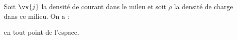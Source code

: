 ﻿\documentclass[a4paper]{article}
\begin{document}
\pagestyle{fancy}
\fancyhf{}
\setlength{\headheight}{15pt}

\begin{center}
	\large{}
\end{center}


Soit \(\vv{j}\) la densité de courant dans le mileu et soit \(\rho\) la densité de charge dans ce milieu. On a :\begin{center}
\end{center}en tout point de l'espace.
\end{document}
